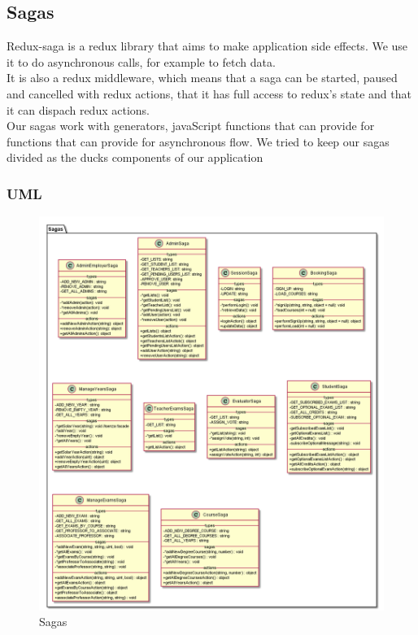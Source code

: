 
	\subsection{Sagas}
	Redux-saga is a redux library that aims to make application side effects. We use it to do asynchronous calls, for example to fetch data.\\
	It is also a redux middleware, which means that a saga can be started, paused and cancelled with redux actions, that it has full access to redux's state and that it can dispach redux actions.\\
	Our sagas work with generators, javaScript functions that can provide for functions that can provide for asynchronous flow. We tried to keep our sagas divided as the ducks components of our application
	\subsubsection{UML}
	\begin{figure}[h]
		\centering
		\includegraphics[width=1\linewidth]{"../diagrammi/redux/sagas"}
		\caption{Sagas}
		\label{fig:Sagas}
	\end{figure}
